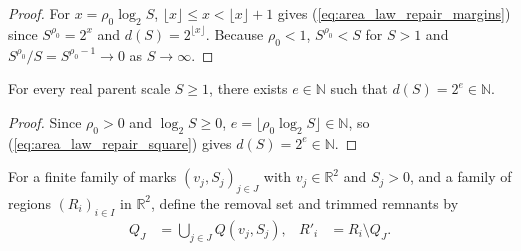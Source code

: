 \begin{proof}
    \leanok
    For $x=\rho_0\log_2 S$, $\lfloor x\rfloor\le x<\lfloor x\rfloor+1$ gives
    (\ref{eq:area_law_repair_margins}) since $S^{\rho_0}=2^x$ and
    $d(S)=2^{\lfloor x\rfloor}$. Because $\rho_0<1$, $S^{\rho_0}<S$ for
    $S>1$ and $S^{\rho_0}/S=S^{\rho_0-1}\to0$ as $S\to\infty$.
\end{proof}

\begin{lemma}
    \label{thm:area_law_repair_halfside_integral}
    \leanok
    For every real parent scale $S\ge1$, there exists $e\in\mathbb N$
    such that $d(S)=2^e\in\mathbb N$.
\end{lemma}

\begin{proof}
    \leanok
    Since $\rho_0>0$ and $\log_2 S\ge0$, $e=\lfloor\rho_0\log_2 S\rfloor\in\mathbb N$,
    so (\ref{eq:area_law_repair_square}) gives $d(S)=2^e\in\mathbb N$.
\end{proof}

\begin{definition}
    \label{def:area_law_simultaneous_remnants}
    \leanok
    For a finite family of marks $(v_j,S_j)_{j\in J}$ with
    $v_j\in\mathbb R^2$ and $S_j>0$, and a family of regions $(R_i)_{i\in I}$
    in $\mathbb R^2$, define the removal set and trimmed remnants by
    \begin{align}
        Q_J  & =\bigcup_{j\in J}Q(v_j,S_j), &
        R'_i & =R_i\setminus Q_J.
        \label{eq:area_law_simultaneous_remnants}
    \end{align}
\end{definition}

